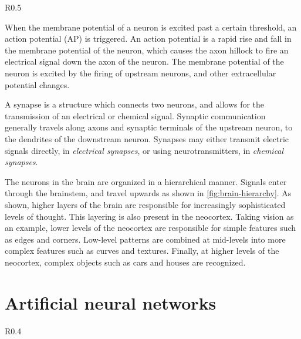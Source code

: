 \documentclass[\rootfolder/main.tex]{subfiles}
\begin{document}
\begin{wrapfigure}{R}{0.5\columnwidth}
    \caption{Model of the hierarcical structure of the brain\cite{Perry1999}.\label{fig:brain-hierarchy}}
\end{wrapfigure}

When the membrane potential of a neuron is excited past a certain threshold, an action potential (AP) is triggered.
An action potential is a rapid rise and fall in the membrane potential of the neuron, which causes the axon hillock to fire an electrical signal down the axon of the neuron.
The membrane potential of the neuron is excited by the firing of upstream neurons, and other extracellular potential changes.

A synapse is a structure which connects two neurons, and allows for the transmission of an electrical or chemical signal.
Synaptic communication generally travels along axons and synaptic terminals of the upstream neuron, to the dendrites of the downstream neuron.
Synapses may either transmit electric signals directly, in \emph{electrical synapses}, or using neurotransmitters, in \emph{chemical synapses}.

The neurons in the brain are organized in a hierarchical manner.
Signals enter through the brainstem, and travel upwards as shown in \cref{fig:brain-hierarchy}.
As shown, higher layers of the brain are responsible for increasingly sophisticated levels of thought.
This layering is also present in the neocortex.
Taking vision as an example, lower levels of the neocortex are responsible for simple features such as edges and corners.
Low-level patterns are combined at mid-levels into more complex features such as curves and textures.
Finally, at higher levels of the neocortex, complex objects such as cars and houses are recognized.


\section{Artificial neural networks}

\begin{wrapfigure}{R}{0.4\columnwidth}
    \caption{Model of an artificial neuron.\label{fig:artificial_neuron}}
\end{wrapfigure}
\end{document}
